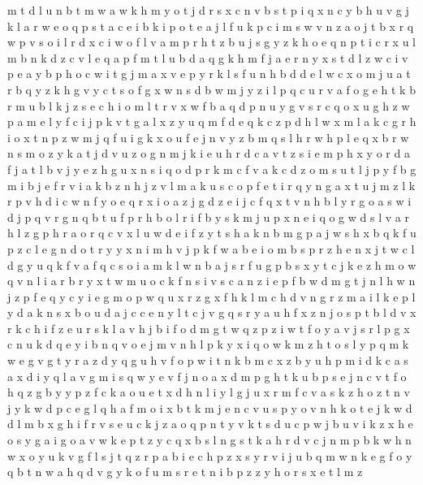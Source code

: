 \documentclass{article}
\begin{document}
m t d l u
n
b t m w
a w k h m y o t j d r s x c n v b
s t p i q x n c y b h u v g j k l a r w e o
q p s t a c e i b
k i p o t e a j
l f u k p c i m s w v n z a o j t b x r
q w p v s o i l r
d x c i w o f l v a m p r h t z b u j s g y
z k h o e q n p t i c r x u l
m b n k d z c v l e q a p
f m t l u b d a
q g k h m f j a e r n y x s t d l z w c i v p
e
a y b p h
o c w i t g j m a x v e p y r k l s f u n h b d
d e l w c x o m j u a t r b q y z k h g v
y c t s o f g x w
n s d b w m j y z i l p q c u r v a f o g e h t k
b r
m
u b l
k j z s e c h i o m l t r v x w f b a q d p n u y g
v s r c q o x u g h z w p a m e l y f
c i j p k v t g a l x z y u q m f d e
q k c z p d h l w x m
l a k c g r h i o x t n p z w m j q f u
i g k x o u f e j n v y z b m q s l h r w
h p l e q x b r w n s m o z y k a t j d v u
z o g n m j k i e u h r d c a
v t z s i e m p h x y o r d a f j
a t l b v j y e z h g u x n s i q o d p r k m c f
v a k c d z o m s u t l j p y f b g
m i b j e f r v
i a k b
z n h
j z v l m a k u s c o p f e t i r q y n g
a x t u j m z l k r p v h d i c w n f y o e
q r x i o a z j g
d z e i j c f q x t v n h b l y r g o a s w
i d j p q v r g
n q b t u
f p r h b o l
r i f b y s
k m j u p x n e i q o g w d s l v a r h
l z g p h
r a
o r q c v x l u w d e i f z y t s h a k n b m g p
a j w s h x b q k f u p z c l e g n d o t r y
y x n i m h v j p k f w a b e
i o m b s p r z h e n x j t w c l d g y u q k f v a
f q c s o i a m k l w n b
a j s r
f u g p b s x y t c j k e z h m o w q v n l i a r
b r y x t w m u o c k f n s i
v s c a n z i e p f b w d m g t j
n
l h w n j z p f e q y c
y i e g m o p w q u x r z
g x f h k l m
c h d v n g r z m a i l k e p
l y d a k n s x b o u
d a j c
c e n y
l t c j v g q s r y a u h f x z n
j o s p t b l d v x r k c h i f z
e u r s k l a v h j b i f o d m g t w q z p
z i w t f o y a v j s r l p g x c n u k d q e
y i b n q v o e j
m v n h l p k y x i q o w
k m z h t
o s l
y p q m k w e g
v g t
y
r a z d y q g u h v f o p w i t n k b m c x
z b y u h p m i d k c a s
a x
d i y q l a v g m
i s q w y e v f j n o a x d m p g h t k u b
p s e j n c v t f o h q z g b y
y
p z f c k a o u e t x d h n l
i y l g j u x r m f c v a s k z h o
z t n v j y k w d p c e g l q h a f m o i x
b t k m j e n c v u s p y o
v n h k o t e j
k w d
d l m b x g h i f r v s e u c k j z a o q p n t y
v k t s d u
c p w j b u v i k z x h e o s y g a
i g o a v w k e p t z y c q x b s l n
g s t k a h r d v c j n m p b
k
w
h n w x o y u k v g f l s j t q z r p a b i e
c h p z x s y r v i j u b q m w n k e g f o
y q b t n
w a h q d v g y k o f u m s r e t n i b p z
z y h
o r s x e t l m z
\end{document}
